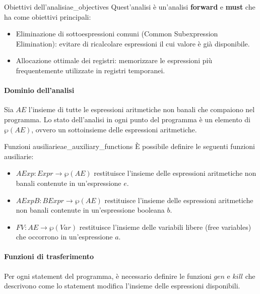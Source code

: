 \begin{nota}{Obiettivi dell'analisi}{ae_objectives}
Quest'analisi è un'analisi \textbf{forward} e \textbf{must} che ha come
obiettivi principali:
\begin{itemize}
    \item Eliminazione di sottoespressioni comuni (Common Subexpression
    Elimination): evitare di ricalcolare espressioni il cui valore è già
    disponibile.
    \item Allocazione ottimale dei registri: memorizzare le espressioni più
    frequentemente utilizzate in registri temporanei.
\end{itemize}
\end{nota}

\paragraph{Dominio dell'analisi}

Sia $AE$ l'insieme di tutte le espressioni aritmetiche non banali che
compaiono nel programma. Lo stato dell'analisi in ogni punto del programma è
un elemento di $\wp(AE)$, ovvero un sottoinsieme delle espressioni
aritmetiche.

\begin{definizione}{Funzioni ausiliarie}{ae_auxiliary_functions}
È possibile definire le seguenti funzioni ausiliarie:
\begin{itemize}
    \item $AExp : \textit{Expr} \to \wp(AE)$ restituisce l'insieme
    delle espressioni aritmetiche non banali contenute in un'espressione $e$.
    \item $AExpB : \textit{BExpr} \to \wp(AE)$ restituisce l'insieme
    delle espressioni aritmetiche non banali contenute in un'espressione
    booleana $b$.
    \item $FV : AE \to \wp(\textit{Var})$ restituisce l'insieme delle
    variabili libere (free variables) che occorrono in un'espressione $a$.
\end{itemize}
\end{definizione}

\paragraph{Funzioni di trasferimento}

Per ogni statement del programma, è necessario definire le funzioni $gen$ e
$kill$ che descrivono come lo statement modifica l'insieme delle espressioni
disponibili.

